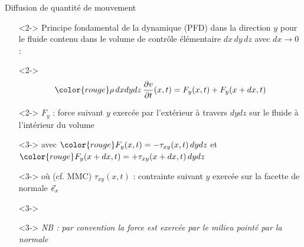 {\begin{frame}{Diffusion de quantité de mouvement}
\begin{itemize}
\item[]<2->
Principe fondamental de la dynamique (PFD) dans la direction $y$ pour le fluide contenu dans le volume de contrôle élémentaire
$dx\,dy\,dz$ avec $dx\rightarrow 0$ :
\item[]<2->
$$\color{rouge} \rho \, dxdydz \, \dpdt{v}(x, t)= F_y(x, t) + F_y(x+dx, t)$$
\item[]<2->
$F_y$ : force suivant $y$ exercée par l'extérieur à travers $dydz$ sur le fluide à l'intérieur du volume 
\item[]<3->
avec $\color{rouge} F_y(x, t) = -\tau_{xy}(x, t) \, dydz$ 
et $\color{rouge} F_y(x+dx, t) = +\tau_{xy}(x+dx, t) \, dydz$
\item[]<3->
o\`u (cf. MMC) $\tau_{xy}(x, t)$ : contrainte suivant $y$ exercée sur la facette de normale $\vec{e}_x$
\item[]<3->
\item[]<3->
\hfill \color{rouge}
\slshape NB : par convention la force est exercée par le milieu pointé par la normale
\end{itemize}

\vspace{4mm}

\end{frame}
}

